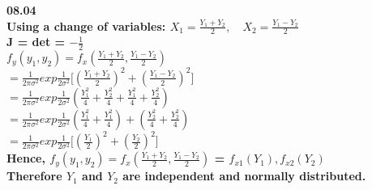 \bf{08.04} \\
 
Using a change of variables: \quad $X_1 = \frac{Y_1 + Y_2}{2}, \quad X_2 = \frac{Y_1 - Y_2}{2}$ \\
 
J = det = $ - \frac{1}{2}$ \\
 
$f_y{(y_1,y_2)} = f_x{\left (\frac{Y_1 + Y_2}{2},\frac{Y_1 - Y_2}{2} \right)}$ \\
 
$ = \frac{1}{2 \pi \sigma^2}exp{\frac{1}{2 \sigma^2}}\Big[{\left (\frac{Y_1 + Y_2}{2} \right)^2 + \left (\frac{Y_1 - Y_2}{2} \right)^2}\Big]$ \\
 
$ = \frac{1}{2 \pi \sigma^2}exp{\frac{1}{2 \sigma^2}}{\left (\frac{Y_1^2}{4} + \frac{Y_2^2}{4} + \frac{Y_1^2}{4} + \frac{Y_2^2}{4} \right)}$ \\
 
$ = \frac{1}{2 \pi \sigma^2}exp{\frac{1}{2 \sigma^2}}{\left (\frac{Y_1^2}{4} + \frac{Y_1^2}{4} \right) + \left (\frac{Y_2^2}{4} + \frac{Y_2^2}{4} \right)}$ \\
 
$ = \frac{1}{2 \pi \sigma^2}exp{\frac{1}{2 \sigma^2}}\Big[{\left (\frac{Y_1}{2} \right)^2 + \left (\frac{Y_2}{2} \right)^2}\Big]$ \\
 
Hence, $f_y{(y_1,y_2)} = f_x{\left (\frac{Y_1 + Y_2}{2},\frac{Y_1 - Y_2}{2} \right)}$ = $f_{x1}{(Y_1)},f_{x2}{(Y_2)}$ \\
 
Therefore $Y_1$ and $Y_2$ are independent and normally distributed. \\

